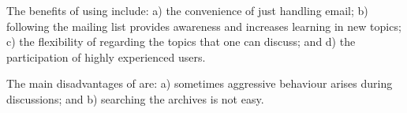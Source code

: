 \subsubsection{\RH}
\label{sec:rh}

The benefits of using \RH include: a) the convenience of just handling email;
 b)  following the mailing list provides awareness and increases learning in new topics;
c) the flexibility of \RH regarding the topics that one can discuss;
and d) the participation of highly experienced users.

The main disadvantages of \RH are: a) sometimes aggressive
behaviour arises during discussions; and b) searching the archives is not easy.


